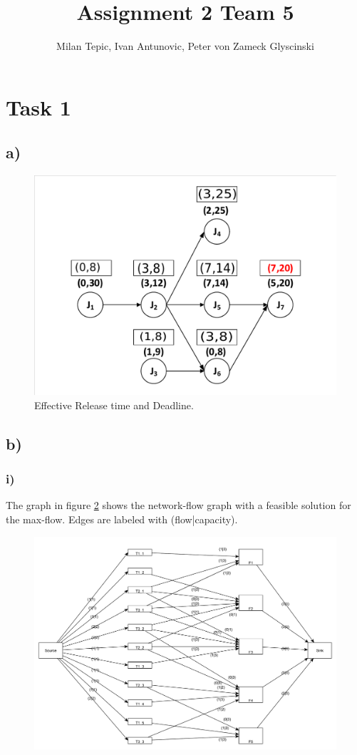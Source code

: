 \documentclass[10pt,a4paper]{article}
\author{Milan Tepic, Ivan Antunovic, Peter von Zameck Glyscinski}
\title{Assignment 2 Team 5}
\begin{document}
\maketitle
\section*{Task 1}
\subsection*{a)}
\begin{figure}[h]
\includegraphics[width=\linewidth]{1a.pdf}
\caption{Effective Release time and Deadline.} 
\label{fig:1a}
\end{figure}
\subsection*{b)}
\subsubsection*{i)}
The graph in figure \ref{fig:1bi} shows the network-flow graph with a feasible solution for the max-flow.
Edges are labeled with (flow|capacity).

\begin{figure}[h]
\includegraphics[width=\linewidth]{maxflow_1b.pdf}
\label{fig:1bi}
\end{figure}
\end{document}
